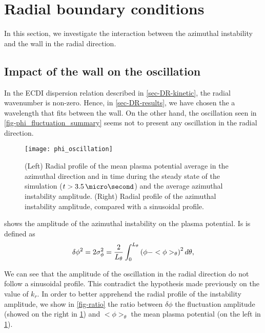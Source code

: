 
\section{Radial boundary conditions}
  \label{sec-DR-BC}
  
  In this section, we investigate the interaction between the azimuthal instability and the wall in the radial direction.
  
  \subsection{Impact of the wall on the oscillation}
  \label{subsec-kr}
  
  In the \ac{ECDI} dispersion relation described in \cref{sec-DR-kinetic}, the radial wavenumber is non-zero.
  Hence, in \cref{sec-DR-results}, we have chosen the a wavelength that fits between the wall.
  On the other hand, the oscillation seen in \cref{fig-phi_fluctuation_summary} seems not to present any oscillation in the radial direction.
  
  
  \begin{figure}[hbtp]
    \centering
    \texttt{[image: phi\_oscillation]}
    \caption{(Left) Radial profile of the mean plasma potential average in the azimuthal direction  and in time during the steady state of the simulation ($t > 3.5 \,\micro\second$) and the average azimuthal instability amplitude. (Right) Radial profile of the  azimuthal instability amplitude, compared with a sinusoidal profile. }
    \label{fig-phi_osci_profile}
  \end{figure}
  
   shows the amplitude of the azimuthal instability on the plasma potential.
  Is is defined as
  \begin{equation} \label{eq-stdphi}
    \delta \phi^2 = 2 \sigma_{\phi}^2 = \frac{{2}}{L_{\theta}} \int_0^{L_{\theta}} \left(  \phi - <\phi>_{\theta}  \right) ^2 d\theta,
  \end{equation}
  
  We can see that the amplitude of the oscillation in the radial direction do not follow a sinusoidal profile.
  This contradict the hypothesis made previously on the value of $k_r$.
  In order to better apprehend the radial profile of the instability amplitude, we show in \cref{fig-ratio} the ratio between $\delta \phi$ the fluctuation amplitude (showed on the right in \cref{fig-phi_osci_profile}) and $<\phi>_{\theta}$  the mean plasma potential (on the left in \cref{fig-phi_osci_profile}).
  
